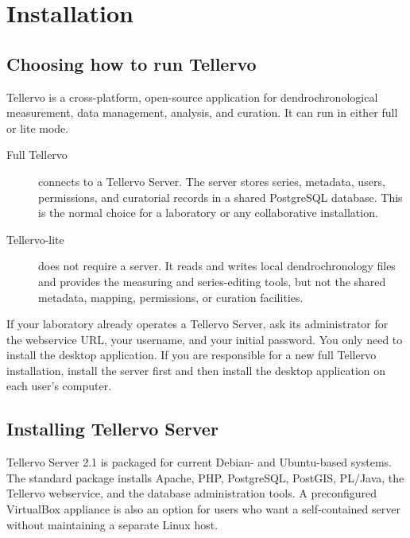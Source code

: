 \chapter{Installation}
\label{txt:installation}

\section{Choosing how to run Tellervo}

Tellervo is a cross-platform, open-source application for dendrochronological
measurement, data management, analysis, and curation. It can run in either full
or lite mode.

\begin{description}
 \item[Full Tellervo] connects to a Tellervo Server. The server stores series,
 metadata, users, permissions, and curatorial records in a shared PostgreSQL
 database. This is the normal choice for a laboratory or any collaborative
 installation.
 \item[Tellervo-lite] does not require a server. It reads and writes local
 dendrochronology files and provides the measuring and series-editing tools, but
 not the shared metadata, mapping, permissions, or curation facilities.
\end{description}

If your laboratory already operates a Tellervo Server, ask its administrator
for the webservice URL, your username, and your initial password. You only need
to install the desktop application. If you are responsible for a new full
Tellervo installation, install the server first and then install the desktop
application on each user's computer.

\section{Installing Tellervo Server}
\label{txt:serverinstallation}

Tellervo Server 2.1 is packaged for current Debian- and Ubuntu-based systems.
The standard package installs Apache, PHP, PostgreSQL, PostGIS, PL/Java, the
Tellervo webservice, and the database administration tools. A preconfigured
VirtualBox appliance is also an option for users who want a self-contained
server without maintaining a separate Linux host.

